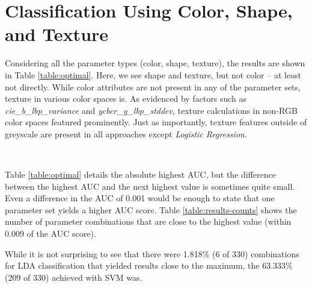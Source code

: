 \documentclass[letterpaper]{report}
\begin{document}
\section{Classification Using Color, Shape, and Texture}
Considering all the parameter types (color, shape, texture), the results are shown in Table \ref{table:optimal}. Here, we see shape and texture, but not color -- at least not directly. While color attributes are not present in any of the parameter sets, texture in various color spaces is. As evidenced by factors such as \textit{cie\_b\_lbp\_variance} and \textit{ycbcr\_y\_lbp\_stddev}, texture calculations in non-RGB color spaces featured prominently. Just as importantly, texture features outside of greyscale are present in all approaches except \textit{Logistic Regression}.

{\
\renewcommand{\arraystretch}{0.9}

}

Table \ref{table:optimal} details the absolute highest AUC, but the difference between the highest AUC and the next highest value is sometimes quite small. Even a difference in the AUC of 0.001 would be enough to state that one parameter set yields a higher AUC score. Table \ref{table:results-counts} shows the number of parameter combinations that are close to the highest value (within 0.009 of the AUC score).

{


}

While it is not surprising to see that there were 1.818\% (6 of 330) combinations for LDA classification that yielded results close to the maximum, the 63.333\% (209 of 330) achieved with SVM was. 
\end{document}
